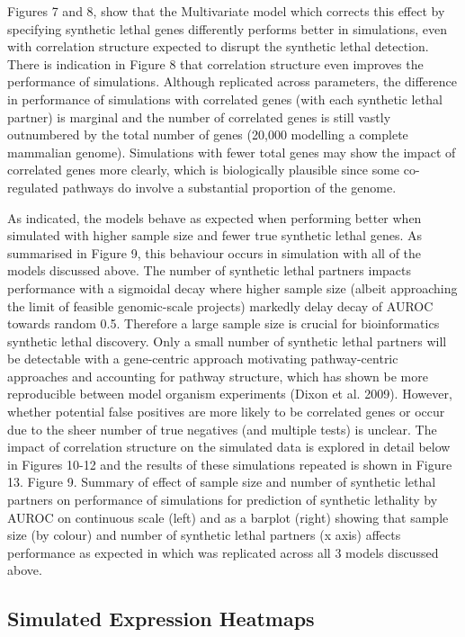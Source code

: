 Figures 7 and 8, show that the Multivariate model which corrects this effect by specifying synthetic lethal genes differently performs better in simulations, even with correlation structure expected to disrupt the synthetic lethal detection.  There is indication in Figure 8 that correlation structure even improves the performance of simulations.  Although replicated across parameters, the difference in performance of simulations with correlated genes (with each synthetic lethal partner) is marginal and the number of correlated genes is still vastly outnumbered by the total number of genes (20,000 modelling a complete mammalian genome).  Simulations with fewer total genes may show the impact of correlated genes more clearly, which is biologically plausible since some co-regulated pathways do involve a substantial proportion of the genome.

As indicated, the models behave as expected when performing better when simulated with higher sample size and fewer true synthetic lethal genes.  As summarised in Figure 9, this behaviour occurs in simulation with all of the models discussed above.  The number of synthetic lethal partners impacts performance with a sigmoidal decay where­­ higher sample size (albeit approaching the limit of feasible genomic-scale projects) markedly delay decay of AUROC towards random 0.5.  Therefore a large sample size is crucial for bioinformatics synthetic lethal discovery.  Only a small number of synthetic lethal partners will be detectable with a gene-centric approach motivating pathway-centric approaches and accounting for pathway structure, which has shown be more reproducible between model organism experiments (Dixon et al. 2009).  However, whether potential false positives are more likely to be correlated genes or occur due to the sheer number of true negatives (and multiple tests) is unclear.  The impact of correlation structure on the simulated data is explored in detail below in Figures 10-12 and the results of these simulations repeated is shown in Figure 13.    Figure 9.  Summary of effect of sample size and number of synthetic lethal partners on performance of simulations for prediction of synthetic lethality by AUROC on continuous scale (left) and as a barplot (right) showing that sample size (by colour) and number of synthetic lethal partners (x axis) affects performance as expected in which was replicated across all 3 models discussed above.

\subsection{Simulated Expression Heatmaps}

